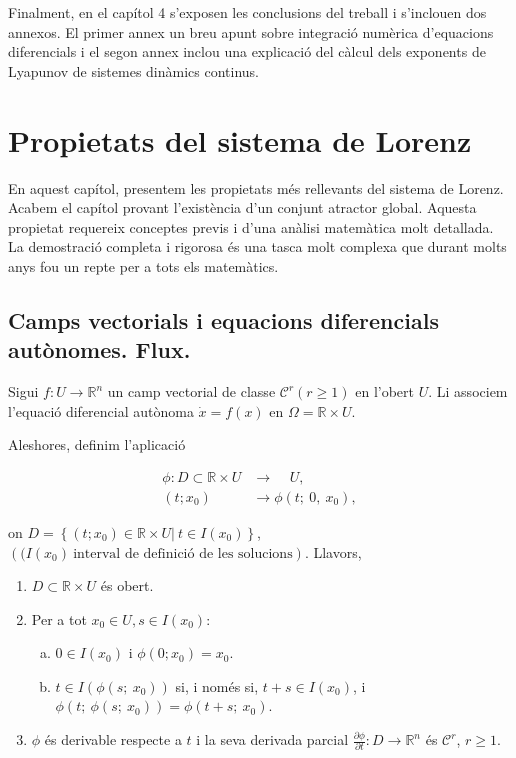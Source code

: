 \documentclass[11pt,a4paper,openright,oneside]{article}
\numberwithin{equation}{section}
\theoremstyle{definition}
\begin{document}
Finalment, en el capítol 4 s'exposen les conclusions del treball i s'inclouen dos annexos. El primer annex un breu apunt sobre integració numèrica d'equacions diferencials i el segon annex inclou una explicació del càlcul dels exponents de Lyapunov de sistemes dinàmics continus.

\newpage

\section{Propietats del sistema de Lorenz} 

En aquest capítol, presentem les propietats més rellevants del sistema de Lorenz. Acabem el capítol provant l'existència d'un conjunt atractor global. Aquesta propietat requereix conceptes previs i d'una anàlisi matemàtica molt detallada. La demostració completa i rigorosa és una tasca molt complexa que durant molts anys fou un repte per a tots els matemàtics.

\subsection{Camps vectorials i equacions diferencials autònomes. Flux.} \label{sssec:flux}
Sigui $f:U\rightarrow{\mathbb{R}}^n$ un camp vectorial de classe $\mathcal{C}^r(r\geq1)$ en l'obert $U$. Li associem l'equació diferencial autònoma $\dot{x}=f(x)$ en $\Omega=\mathbb{R}\times U$. 

Aleshores, definim l'aplicació 

\begin{align*}
     \phi\colon D\subset \mathbb{R}\times U &\longrightarrow{\ \ \ \ \ U}, \\ (t;x_0)&\longrightarrow{\phi(t;\ 0, \ x_0)},
\end{align*}

on $D=\left\{(t;x_0)\in\mathbb{R}\times U \lvert \ t\in I(x_0)\right\}$, $\left((I(x_0) \ \text{interval de definició de les solucions}\right)$. Llavors, 

\begin{enumerate}
    \item $D\subset \mathbb{R}\times U$ és obert.

    \item Per a tot $x_0\in U, s\in I(x_0):$
    \begin{enumerate}[(a)]
        \item $0\in I(x_0)$ i $\phi(0;x_0) =x_0$. 
        
        \item $t\in I\left(\phi(s;\ x_0)\right)$ si, i només si, $t+s\in I(x_0)$, i $\phi\left(t;\ \phi(s;\ x_0)\right)=\phi(t+s;\ x_0)$.
    \end{enumerate}

    \item $\phi$ és derivable respecte a $t$ i la seva derivada parcial $\frac{\partial \phi}{\partial t}\colon D\rightarrow{\mathbb{R}^n}$ és $\mathcal{C}^r$, $r\geq1$.
\end{enumerate}
\end{document}
